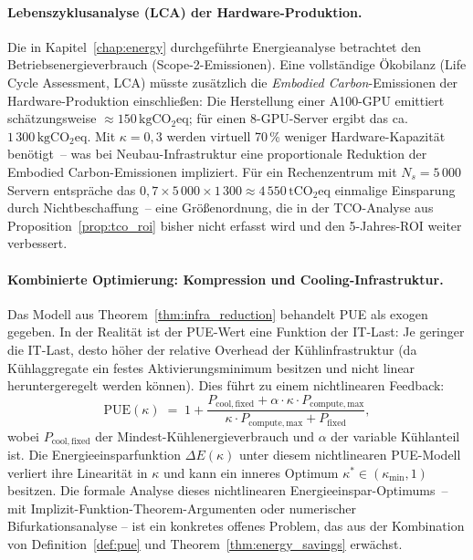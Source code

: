 ﻿\documentclass[12pt, a4paper, openany]{report}
\begin{document}
\paragraph{Lebenszyklusanalyse (LCA) der Hardware-Produktion.}
Die in Kapitel~\ref{chap:energy} durchgeführte Energieanalyse betrachtet
den Betriebsenergieverbrauch (Scope-2-Emissionen).  Eine vollständige
Ökobilanz (Life Cycle Assessment, LCA) müsste zusätzlich die
\emph{Embodied Carbon}-Emissionen der Hardware-Produktion einschließen:
Die Herstellung einer A100-GPU emittiert schätzungsweise
$\approx 150\,\mathrm{kgCO_2eq}$; für einen 8-GPU-Server ergibt das
ca.\,$1\,300\,\mathrm{kgCO_2eq}$.  Mit $\kappa = 0{,}3$ werden virtuell
70\,\% weniger Hardware-Kapazität benötigt~-- was bei Neubau-Infrastruktur
eine proportionale Reduktion der Embodied Carbon-Emissionen impliziert.
Für ein Rechenzentrum mit $N_s = 5\,000$ Servern entspräche das
$0{,}7 \times 5\,000 \times 1\,300 \approx 4\,550\,\mathrm{tCO_2eq}$
einmalige Einsparung durch Nichtbeschaffung~-- eine Größenordnung, die in
der TCO-Analyse aus Proposition~\ref{prop:tco_roi} bisher nicht erfasst
wird und den 5-Jahres-ROI weiter verbessert.

\paragraph{Kombinierte Optimierung: Kompression und Cooling-Infrastruktur.}
Das Modell aus Theorem~\ref{thm:infra_reduction} behandelt PUE als exogen
gegeben.  In der Realität ist der PUE-Wert eine Funktion der IT-Last:
Je geringer die IT-Last, desto höher der relative Overhead der
Kühlinfrastruktur (da Kühlaggregate ein festes Aktivierungsminimum besitzen
und nicht linear heruntergeregelt werden können).  Dies führt zu einem
nichtlinearen Feedback:
\[
  \mathrm{PUE}(\kappa)
  \;=\; 1 + \frac{P_{\mathrm{cool,fixed}} + \alpha \cdot \kappa \cdot P_{\mathrm{compute,max}}}
                  {\kappa \cdot P_{\mathrm{compute,max}} + P_{\mathrm{fixed}}},
\]
wobei $P_{\mathrm{cool,fixed}}$ der Mindest-Kühlenergieverbrauch und $\alpha$
der variable Kühlanteil ist.  Die Energieeinsparfunktion $\Delta E(\kappa)$
unter diesem nichtlinearen PUE-Modell verliert ihre Linearität in $\kappa$
und kann ein inneres Optimum $\kappa^* \in (\kappa_{\min}, 1)$ besitzen.
Die formale Analyse dieses nichtlinearen Energieeinspar-Optimums~-- mit
Implizit-Funktion-Theorem-Argumenten oder numerischer Bifurkationsanalyse
-- ist ein konkretes offenes Problem, das aus der Kombination von
Definition~\ref{def:pue} und Theorem~\ref{thm:energy_savings} erwächst.
\end{document}

